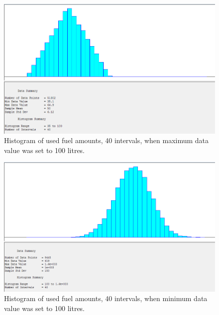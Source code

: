 \begin{figure}[h]
	\includegraphics[width=\textwidth]{images/histogram-amounts-filtered.PNG}
	\caption{Histogram of used fuel amounts, 40 intervals, when maximum data value was set to 100 litres.}
	\label{fig:histogram-amounts-filtered}
\end{figure}

\begin{figure}[h]
	\includegraphics[width=\textwidth]{images/histogram-amounts-filtered-min100.PNG}
	\caption{Histogram of used fuel amounts, 40 intervals, when minimum data value was set to 100 litres.}
	\label{fig:histogram-amounts-filtered-trucks}
\end{figure}

